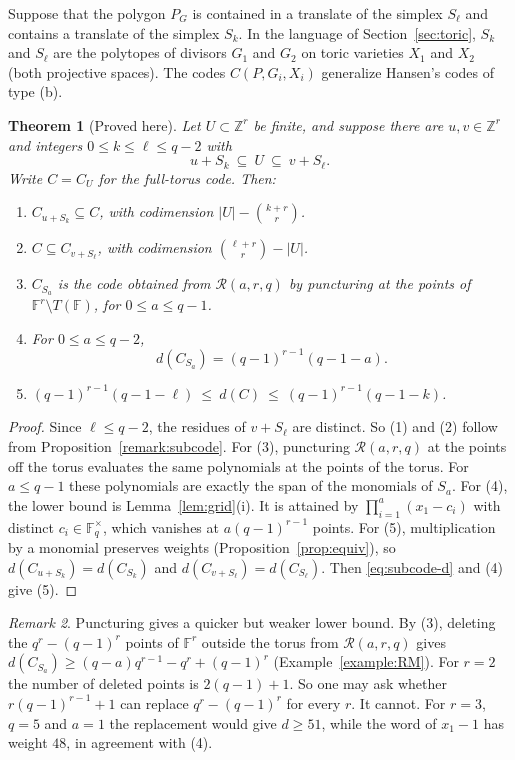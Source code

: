\documentclass[12pt,letterpaper]{article}
\numberwithin{equation}{section}
\newtheorem{theorem}{Theorem}[section]
\theoremstyle{definition}
\theoremstyle{remark}
\newtheorem{remark}[theorem]{Remark}
\newcommand{\F}{\mathbb{F}}
\newcommand{\Z}{\mathbb{Z}}
\newcommand{\Fqs}{\mathbb{F}_q^{\times}}
\newcommand{\RM}{\mathcal{R}}
\begin{document}
Suppose that the polygon $P_G$ is contained in a translate of the simplex
$S_\ell$ and contains a translate of the simplex $S_k$. In the language of
Section~\ref{sec:toric}, $S_k$ and $S_\ell$ are the polytopes of divisors $G_1$ and
$G_2$ on toric varieties $X_1$ and $X_2$ (both projective spaces). The codes
$C(P,G_i,X_i)$ generalize Hansen's codes of type (b).

\begin{theorem}[Proved here]\label{thrm:subcode2}
Let $U\subset\Z^r$ be finite, and suppose there are $u,v\in\Z^r$ and integers
$0\le k\le\ell\le q-2$ with
\[
u+S_k\ \subseteq\ U\ \subseteq\ v+S_\ell .
\]
Write $C=C_U$ for the full-torus code. Then:
\begin{enumerate}[label=(\arabic*)]
\item $C_{u+S_k}\subseteq C$, with codimension $|U|-\binom{k+r}{r}$.
\item $C\subseteq C_{v+S_\ell}$, with codimension $\binom{\ell+r}{r}-|U|$.
\item $C_{S_a}$ is the code obtained from $\RM(a,r,q)$ by puncturing at the
points of $\F^r\setminus T(\F)$, for $0\le a\le q-1$.
\item For $0\le a\le q-2$,
\[
d(C_{S_a})=(q-1)^{r-1}(q-1-a).
\]
\item $(q-1)^{r-1}(q-1-\ell)\ \le\ d(C)\ \le\ (q-1)^{r-1}(q-1-k)$.
\end{enumerate}
\end{theorem}

\begin{proof}
Since $\ell\le q-2$, the residues of $v+S_\ell$ are distinct. So (1) and (2)
follow from Proposition~\ref{remark:subcode}. For (3), puncturing $\RM(a,r,q)$
at the points off the torus evaluates the same polynomials at the points of
the torus. For $a\le q-1$ these polynomials are exactly the span of the
monomials of $S_a$. For (4), the lower bound is Lemma~\ref{lem:grid}(i). It is
attained by $\prod_{i=1}^{a}(x_1-c_i)$ with distinct $c_i\in\Fqs$, which
vanishes at $a(q-1)^{r-1}$ points. For (5), multiplication by a monomial
preserves weights (Proposition~\ref{prop:equiv}), so $d(C_{u+S_k})=d(C_{S_k})$
and $d(C_{v+S_\ell})=d(C_{S_\ell})$. Then \eqref{eq:subcode-d} and (4) give
(5).
\end{proof}

\begin{remark}\label{rem:oldsubcode}
Puncturing gives a quicker but weaker lower bound. By (3), deleting the
$q^r-(q-1)^r$ points of $\F^r$ outside the torus from $\RM(a,r,q)$ gives
$d(C_{S_a})\ge(q-a)q^{r-1}-q^r+(q-1)^r$ (Example~\ref{example:RM}). For $r=2$
the number of deleted points is $2(q-1)+1$. So one may ask whether
$r(q-1)^{r-1}+1$ can replace $q^r-(q-1)^r$ for every $r$. It cannot. For
$r=3$, $q=5$ and $a=1$ the replacement would give $d\ge51$, while the word of
$x_1-1$ has weight $48$, in agreement with (4).
\end{remark}
\end{document}
